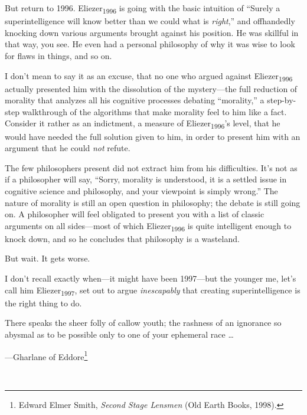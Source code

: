 {
 But return to 1996. Eliezer\textsubscript{1996} is going with the
basic intuition of ``Surely a superintelligence will
know better than we could what is \textit{right},''
and offhandedly knocking down various arguments brought against his
position. He was skillful in that way, you see. He even had a personal
philosophy of why it was wise to look for flaws in things, and so on.}

{
 I don't mean to say it as an excuse, that no one
who argued against Eliezer\textsubscript{1996} actually presented him
with the dissolution of the mystery---the full reduction of morality
that analyzes all his cognitive processes debating
``morality,'' a step-by-step
walkthrough of the algorithms that make morality feel to him like a
fact. Consider it rather as an indictment, a measure of
Eliezer\textsubscript{1996}'s level, that he would have
needed the full solution given to him, in order to present him with an
argument that he could \textit{not} refute.}

{
 The few philosophers present did not extract him from his
difficulties. It's not as if a philosopher will say,
``Sorry, morality is understood, it is a settled issue
in cognitive science and philosophy, and your viewpoint is simply
wrong.'' The nature of morality is still an open
question in philosophy; the debate is still going on. A philosopher
will feel obligated to present you with a list of classic arguments on
all sides---most of which Eliezer\textsubscript{1996} is quite
intelligent enough to knock down, and so he concludes that philosophy
is a wasteland.}

{
 But wait. It gets worse.}

{
 I don't recall exactly when---it might have been
1997---but the younger me, let's call him
Eliezer\textsubscript{1997}, set out to argue \textit{inescapably} that
creating superintelligence is the right thing to do.}

\myendsectiontext


{
 There speaks the sheer folly of callow youth; the rashness of an
ignorance so abysmal as to be possible only to one of your ephemeral
race \ldots}

{\raggedleft
 {}---Gharlane of Eddore\footnote{Edward Elmer Smith, \textit{Second Stage Lensmen} (Old Earth
Books, 1998).}
\par}


\bigskip

{
 ~}

